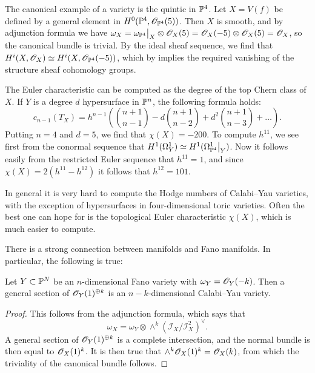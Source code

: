 \begin{example}
The canonical example of a \CY variety is the quintic in $\P^4$. Let $X=V(f)$ be defined by a general element in $H^0(\P^4,\OO_{\P^4}(5))$. Then $X$ is smooth, and by adjunction formula we have $\omega_X = \restr{\omega_{\P^4}}{X} \otimes \OO_X(5)=\OO_X(-5) \otimes \OO_X(5) = \OO_X$, so the canonical bundle is trivial. By the ideal sheaf sequence, we find that $H^i(X,\OO_X) \simeq H^i(X,\OO_{\P^4}(-5))$, which by \cite[Theorem 5.1, Chapter III]{hartshorne} implies the required vanishing of the structure sheaf cohomology groups.

The Euler characteristic can be computed as the degree of the top Chern class of $X$. If $Y$ is a degree $d$ hypersurface in $\P^n$, the following formula holds:
$$
c_{n-1}(T_X) = h^{n-1} \left( \binom{n+1}{n-1} - d \binom{n+1}{n-2} + d^2 \binom{n+1}{n-3} + \ldots\right).
$$
Putting $n=4$ and $d=5$, we find that $\chi(X)=-200$. To compute $h^{11}$, we see first from the conormal sequence that $H^1(\Omega_Y^1) \simeq H^1(\restr{\Omega_{\P^4}^1}{Y})$. Now it follows easily from the restricted Euler sequence that $h^{11}=1$, and since $\chi(X)=2(h^{11}-h^{12})$ it follows that $h^{12}=101$.
\end{example}

In general it is very hard to compute the Hodge numbers of Calabi--Yau varieties, with the exception of hypersurfaces in four-dimensional toric varieties. Often the best one can hope for is the topological Euler characteristic $\chi(X)$, which is much easier to compute.

There is a strong connection between \CY manifolds and Fano manifolds. In particular, the following is true:

\begin{proposition}
Let $Y \subset \P^N$ be an $n$-dimensional Fano variety with $\omega_Y=\OO_Y(-k)$. Then a general section of $\OO_Y(1)^{\oplus k}$ is an $n-k$-dimensional Calabi--Yau variety.
\end{proposition}
\begin{proof}
This follows from the adjunction formula, which says that
$$
\omega_X = \omega_Y \otimes \wedge^k (\mathcal I_X /\mathcal I_X^2)^\vee.
$$
A general section of $\OO_Y(1)^{\oplus k}$ is a complete intersection, and the normal bundle is then equal to $\OO_X(1)^k$. It is then true that $\wedge^k \OO_X(1)^k = \OO_X(k)$, from which the triviality of the canonical bundle follows.
\end{proof}

